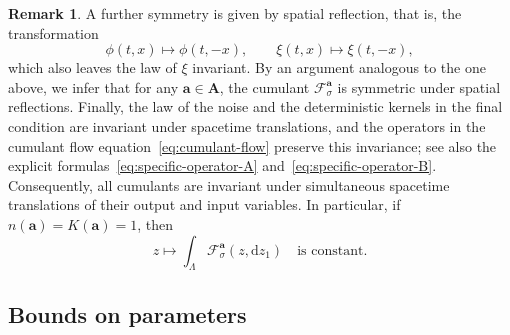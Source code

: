 \documentclass{article}
\numberwithin{equation}{section}
\newcommand{\mathd}{\mathrm{d}}
\theoremstyle{plain}
\theoremstyle{definition}
\newtheorem{remark}[theorem]{Remark}
\begin{document}
\begin{remark}
  A further symmetry is given by spatial reflection, that is, the
  transformation
  \[ \phi (t, x) \mapsto \phi (t, - x), \qquad \xi (t, x) \mapsto \xi (t, -
     x), \]
  which also leaves the law of $\xi$ invariant. By an argument analogous to
  the one above, we infer that for any $\boldsymbol{a} \in
  \boldsymbol{A}$, the cumulant $\mathcal{F}^{\boldsymbol{a}}_{\sigma}$ is symmetric
  under spatial reflections.
  Finally, the law of the noise and the deterministic kernels in the final
  condition are invariant under spacetime translations, and the operators in
  the cumulant flow equation~\eqref{eq:cumulant-flow} preserve this invariance;
  see also the explicit formulas~\eqref{eq:specific-operator-A}
  and~\eqref{eq:specific-operator-B}. Consequently, all cumulants are invariant
  under simultaneous spacetime translations of their output and input
  variables. In particular, if $n(\boldsymbol a)=K(\boldsymbol a)=1$, then
  \begin{equation}
    z\longmapsto
    \int_\Lambda \mathcal F^{\boldsymbol a}_\sigma(z,\mathd z_1)
    \quad\text{is constant.}
    \label{eq:one-point-mass-translation}
  \end{equation}
\end{remark}

\subsection{Bounds on parameters}\label{sec:bounds-on-parameters}
\end{document}
